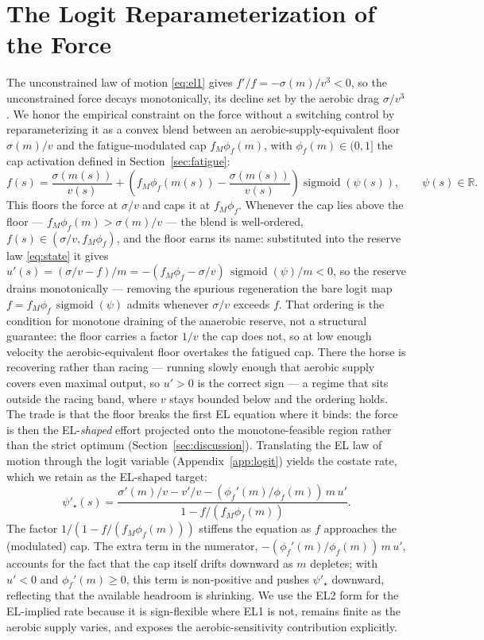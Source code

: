 \documentclass[11pt]{article}
\DeclareMathOperator{\sigmoid}{sigmoid}
\begin{document}
\section{The Logit Reparameterization of the Force}

The unconstrained law of motion \eqref{eq:el1} gives $f'/f = -\sigma(m)/v^3 < 0$, so the unconstrained force decays monotonically, its decline set by the aerobic drag $\sigma/v^3$. We honor the empirical constraint on the force without a switching control by reparameterizing it as a convex blend between an aerobic-supply-equivalent floor $\sigma(m)/v$ and the fatigue-modulated cap $f_M \phi_f(m)$, with $\phi_f(m) \in (0, 1]$ the cap activation defined in Section~\ref{sec:fatigue}:
\begin{equation}\label{eq:blend}
f(s) = \frac{\sigma(m(s))}{v(s)} + \left(f_M \phi_f(m(s)) - \frac{\sigma(m(s))}{v(s)}\right)\sigmoid(\psi(s)), \qquad \psi(s) \in \mathbb{R}.
\end{equation}
This floors the force at $\sigma/v$ and caps it at $f_M \phi_f$. Whenever the cap lies above the floor --- $f_M \phi_f(m) > \sigma(m)/v$ --- the blend is well-ordered, $f(s) \in (\sigma/v, f_M \phi_f)$, and the floor earns its name: substituted into the reserve law \eqref{eq:state} it gives $u'(s) = (\sigma/v - f)/m = -(f_M \phi_f - \sigma/v)\,\sigmoid(\psi)/m < 0$, so the reserve drains monotonically --- removing the spurious regeneration the bare logit map $f = f_M \phi_f\,\sigmoid(\psi)$ admits whenever $\sigma/v$ exceeds $f$. That ordering is the condition for monotone draining of the anaerobic reserve, not a structural guarantee: the floor carries a factor $1/v$ the cap does not, so at low enough velocity the aerobic-equivalent floor overtakes the fatigued cap. There the horse is recovering rather than racing --- running slowly enough that aerobic supply covers even maximal output, so $u' > 0$ is the correct sign --- a regime that sits outside the racing band, where $v$ stays bounded below and the ordering holds. The trade is that the floor breaks the first EL equation where it binds: the force is then the EL-\emph{shaped} effort projected onto the monotone-feasible region rather than the strict optimum (Section~\ref{sec:discussion}). Translating the EL law of motion through the logit variable (Appendix~\ref{app:logit}) yields the costate rate, which we retain as the EL-shaped target:
\begin{equation}\label{eq:psistar}
\psi'_{\star}(s) = \frac{\sigma'(m)/v - v'/v - (\phi_f'(m)/\phi_f(m))\, m\, u'}{1 - f/(f_M \phi_f(m))}.
\end{equation}
The factor $1/(1 - f/(f_M \phi_f(m)))$ stiffens the equation as $f$ approaches the (modulated) cap. The extra term in the numerator, $-(\phi_f'(m)/\phi_f(m))\, m\, u'$, accounts for the fact that the cap itself drifts downward as $m$ depletes; with $u' < 0$ and $\phi_f'(m) \geq 0$, this term is non-positive and pushes $\psi'_\star$ downward, reflecting that the available headroom is shrinking. We use the EL2 form for the EL-implied rate because it is sign-flexible where EL1 is not, remains finite as the aerobic supply varies, and exposes the aerobic-sensitivity contribution explicitly.
\end{document}
